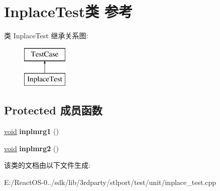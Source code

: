 \hypertarget{class_inplace_test}{}\section{Inplace\+Test类 参考}
\label{class_inplace_test}
类 Inplace\+Test 继承关系图\+:\begin{figure}[H]
\begin{center}
\leavevmode
\includegraphics[height=2.000000cm]{class_inplace_test}
\end{center}
\end{figure}
\subsection*{Protected 成员函数}
\begin{DoxyCompactItemize}
\item 
\mbox{\label{class_inplace_test_a8835039a0a380d7209ccfd2c5bbe58e0}} 
\hyperlink{interfacevoid}{void} {\bfseries inplmrg1} ()
\item 
\mbox{\label{class_inplace_test_a6f31487e799172887a4456bebbc842d3}} 
\hyperlink{interfacevoid}{void} {\bfseries inplmrg2} ()
\end{DoxyCompactItemize}


该类的文档由以下文件生成\+:\begin{DoxyCompactItemize}
\item 
E\+:/\+React\+O\+S-\/0../sdk/lib/3rdparty/stlport/test/unit/inplace\+\_\+test.\+cpp\end{DoxyCompactItemize}
